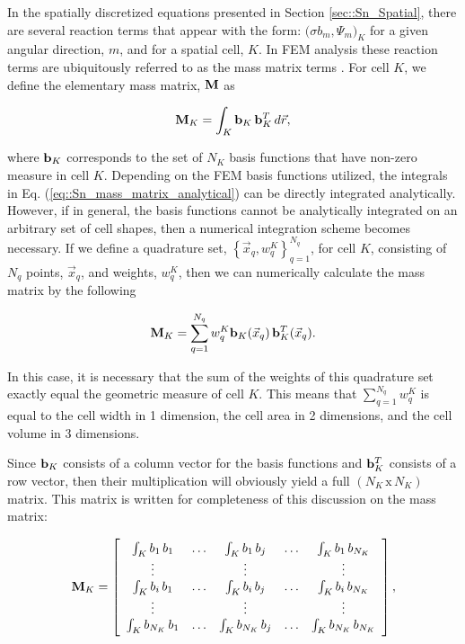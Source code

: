In the spatially discretized equations presented in Section \ref{sec::Sn_Spatial}, there are several reaction terms that appear with the form: $\Big( \sigma  b_m , \Psi_m  \Big)_K$ for a given angular direction, $m$, and for a spatial cell, $K$. In FEM analysis these reaction terms are ubiquitously referred to as the mass matrix terms \cite{zeinkiewicz2005finite,akin1982application}. For cell $K$, we define the elementary mass matrix, ${\bf M}$ as

\begin{equation}
\label{eq::Sn_mass_matrix_analytical}
{\bf M}_K =    \int_K {\bf b}_K \, {\bf b}_K^T \, d {\vec{r}} ,
\end{equation}

\noindent where ${\bf b}_K$ corresponds to the set of $N_K$ basis functions that have non-zero measure in cell $K$. Depending on the FEM basis functions utilized, the integrals in Eq. (\ref{eq::Sn_mass_matrix_analytical}) can be directly integrated analytically. However, if in general, the basis functions cannot be analytically integrated on an arbitrary set of cell shapes, then a numerical integration scheme becomes necessary. If we define a quadrature set, $\left\{  \vec{x}_q , w_q^{K}  \right\}_{q=1}^{N_q}$, for cell $K$, consisting of $N_q$ points, $\vec{x}_q$, and weights, $w_q^K$, then we can numerically calculate the mass matrix by the following

\begin{equation}
\label{eq::Sn_mass_matrix_numerical}
{\bf M}_K =    \sum_{q = 1}^{N_q} w_{q}^K {\bf b}_K (\vec{x}_q) \, {\bf b}_K^T (\vec{x}_q)  .
\end{equation}

\noindent In this case, it is necessary that the sum of the weights of this quadrature set exactly equal the geometric measure of cell $K$. This means that $\sum_{q = 1}^{N_q} w_{q}^K$ is equal to the cell width in 1 dimension, the cell area in 2 dimensions, and the cell volume in 3 dimensions.

Since ${\bf b}_K$ consists of a column vector for the basis functions and ${\bf b}_K^{T}$ consists of a row vector, then their multiplication will obviously yield a full $(N_K \, \text{x} \, N_K)$ matrix. This matrix is written for completeness of this discussion on the mass matrix:

\begin{equation}
\label{eq::Sn_mass_matrix_array}
{\bf M}_K =   \left[
\begin{array} {ccccc}
	\int_K b_1 \, b_1  & \ldots & \int_K b_1 \, b_j  & \ldots & \int_K b_1 \, b_{N_K} \\
	\vdots  &  & \vdots  &  & \vdots \\
	\int_K b_i \, b_1  & \ldots & \int_K b_i \, b_j  & \ldots & \int_K b_i \, b_{N_K} \\
	\vdots  &  & \vdots  &  & \vdots \\
	\int_K b_{N_K} \, b_1  & \ldots & \int_K b_{N_K} \, b_j  & \ldots & \int_K b_{N_K} \, b_{N_K} \\
\end{array}
\right] ,
\end{equation}

